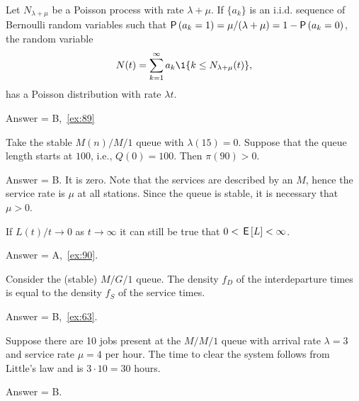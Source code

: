 \begin{exercise}[201907]
 Let $N_{\lambda+\mu}$ be a Poisson process with rate $\lambda+\mu$. If $\{a_k\}$ is an i.i.d. sequence of Bernoulli random variables such that $\P{a_k=1} = \mu/(\lambda+\mu)=1-\P{a_k=0}$, the random variable
 \begin{equation*}
 N(t) = \sum_{k=1}^\infty a_k \1{k \leq N_{\lambda+\mu}(t)},
 \end{equation*}
has a Poisson distribution with rate $\lambda t$. 
\begin{solution}
Answer = B,~\cref{ex:89}
\end{solution}
\end{exercise}

\begin{exercise}[201907]
Take the stable $M(n)/M/1$ queue with $\lambda(15) =0$. Suppose that the queue length starts at $100$, i.e., $Q(0) = 100$. Then $\pi(90) > 0$. 
\begin{solution}
Answer = B. It is zero. Note that the services are described by an $M$, hence the service rate is $\mu$ at all stations. Since the queue is stable, it is necessary that $\mu>0$. 
\end{solution}
\end{exercise}

\begin{exercise}[201907]
 If $L(t)/t \to 0$ as $t\to\infty$ it can still be true that $0<\,\mathsf{E}\left[L\right]<\infty$.
\begin{solution}
Answer = A,~\cref{ex:90}.
\end{solution}
\end{exercise}

\begin{exercise}[201907]
 Consider the (stable) $M/G/1$ queue. The density $f_D$ of the interdeparture times is equal to the density $f_S$ of the service times. 
\begin{solution}
Answer = B,~\cref{ex:63}.
\end{solution}
\end{exercise}

\begin{exercise}[201907]
 Suppose there are 10 jobs present at the $M/M/1$ queue with arrival rate $\lambda=3$ and service rate $\mu=4$ per hour.
 The time to clear the system follows from Little's law and is $3\cdot 10 = 30$ hours.
\begin{solution}
Answer = B.
\end{solution}
\end{exercise}

